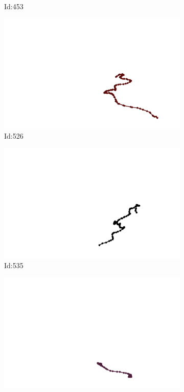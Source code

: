 \documentclass[12pt,twoside]{report}
\begin{document}
\begin{figure}
\begin{subfigure}[b]{0.20\textwidth}
\caption{Id:453}
\end{subfigure}
\begin{subfigure}[b]{0.20\textwidth}
\centering
\includegraphics[width=\textwidth]{../trajectories/526.png}
\caption{Id:526}
\end{subfigure}
\begin{subfigure}[b]{0.20\textwidth}
\centering
\includegraphics[width=\textwidth]{../trajectories/535.png}
\caption{Id:535}
\end{subfigure}
\begin{subfigure}[b]{0.20\textwidth}
\centering
\includegraphics[width=\textwidth]{../trajectories/536.png}

\end{subfigure}
\end{figure}
\end{document}
